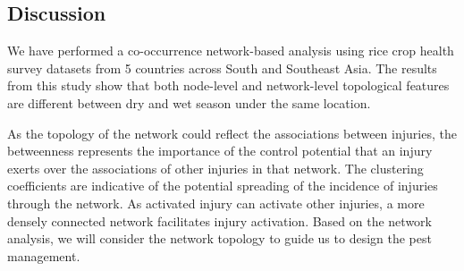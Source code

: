 \subsection{Discussion}

We have performed a co-occurrence network-based analysis using rice crop health survey datasets from 5 countries across South and Southeast Asia. The results from this study show that both node-level and network-level topological features are different between dry and wet season under the same location. 

As the topology of the network could reflect the associations between injuries, the betweenness represents the importance of the control potential that an injury exerts over the associations of other injuries in that network. The clustering coefficients are indicative of the potential spreading of the incidence of injuries through the network. As activated injury can activate other injuries, a more densely connected network facilitates injury activation. Based on the network analysis, we will consider the network topology to guide us to design the pest management.


